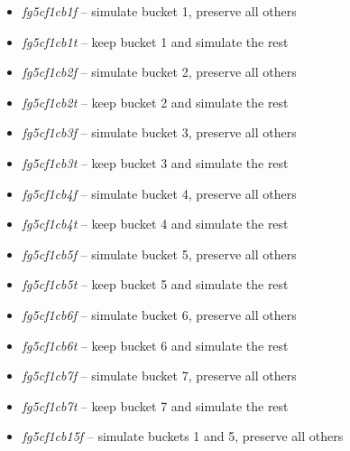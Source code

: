 \documentclass[10pt,oneside]{memoir}
\begin{document}
\begin{itemize}


\item {\itshape fg5cf1c{\itshape {\itshape b1f}}} -- simulate bucket 1, preserve all others

\item {\itshape fg5cf1c{\itshape {\itshape b1t}}} -- keep bucket 1 and simulate the rest

\item {\itshape fg5cf1c{\itshape {\itshape b2f}}} -- simulate bucket 2, preserve all others

\item {\itshape fg5cf1c{\itshape {\itshape b2t}}} -- keep bucket 2 and simulate the rest

\item {\itshape fg5cf1c{\itshape {\itshape b3f}}} -- simulate bucket 3, preserve all others

\item {\itshape fg5cf1c{\itshape {\itshape b3t}}} -- keep bucket 3 and simulate the rest

\item {\itshape fg5cf1c{\itshape {\itshape b4f}}} -- simulate bucket 4, preserve all others

\item {\itshape fg5cf1c{\itshape {\itshape b4t}}} -- keep bucket 4 and simulate the rest

\item {\itshape fg5cf1c{\itshape {\itshape b5f}}} -- simulate bucket 5, preserve all others

\item {\itshape fg5cf1c{\itshape {\itshape b5t}}} -- keep bucket 5 and simulate the rest

\item {\itshape fg5cf1c{\itshape {\itshape b6f}}} -- simulate bucket 6, preserve all others

\item {\itshape fg5cf1c{\itshape {\itshape b6t}}} -- keep bucket 6 and simulate the rest

\item {\itshape fg5cf1c{\itshape {\itshape b7f}}} -- simulate bucket 7, preserve all others

\item {\itshape fg5cf1c{\itshape {\itshape b7t}}} -- keep bucket 7 and simulate the rest

\item {\itshape fg5cf1c{\itshape {\itshape b15f}}} -- simulate buckets 1 and 5, preserve all others


\end{itemize}
\end{document}
